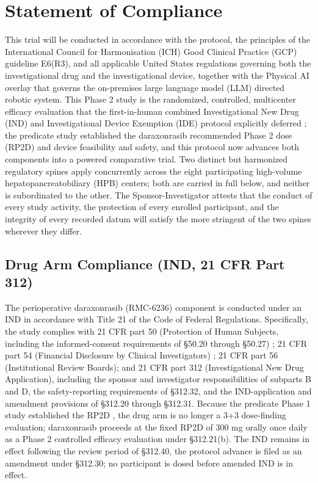 \section{Statement of Compliance}

This trial will be conducted in accordance with the protocol, the principles of
the International Council for Harmonisation (ICH) Good Clinical Practice (GCP)
guideline E6(R3), and all applicable United States regulations governing both
the investigational drug and the investigational device, together with the
Physical AI overlay that governs the on-premises large language model (LLM)
directed robotic system. This Phase 2 study is the randomized, controlled,
multicenter efficacy evaluation that the first-in-human combined Investigational
New Drug (IND) and Investigational Device Exemption (IDE) protocol explicitly
deferred \cite{kawchak2026phase1}; the predicate study established the
daraxonrasib recommended Phase 2 dose (RP2D) and device feasibility and safety,
and this protocol now advances both components into a powered comparative trial.
Two distinct but harmonized regulatory spines apply concurrently across the eight
participating high-volume hepatopancreatobiliary (HPB) centers; both are carried
in full below, and neither is subordinated to the other. The Sponsor-Investigator
attests that the conduct of every study activity, the protection of every
enrolled participant, and the integrity of every recorded datum will satisfy the
more stringent of the two spines wherever they differ.

\subsection{Drug Arm Compliance (IND, 21 CFR Part 312)}

The perioperative daraxonrasib (RMC-6236) component is conducted under an IND in
accordance with Title 21 of the Code of Federal Regulations. Specifically, the
study complies with 21 CFR part 50 (Protection of Human Subjects, including the
informed-consent requirements of \S50.20 through \S50.27) \cite{ecfr2026part50};
21 CFR part 54 (Financial Disclosure by Clinical Investigators)
\cite{ecfr2026part54}; 21 CFR part 56 (Institutional Review Boards); and 21 CFR
part 312 (Investigational New Drug Application), including the sponsor and
investigator responsibilities of subparts B and D, the safety-reporting
requirements of \S312.32, and the IND-application and amendment provisions of
\S312.20 through \S312.31. Because the predicate Phase 1 study established the
RP2D \cite{kawchak2026phase1}, the drug arm is no longer a 3+3 dose-finding
evaluation; daraxonrasib proceeds at the fixed RP2D of 300 mg orally once daily
as a Phase 2 controlled efficacy evaluation under \S312.21(b). The IND remains in
effect following the review period of \S312.40, the protocol advance is filed as
an amendment under \S312.30; no participant is dosed before amended IND
is in effect.

